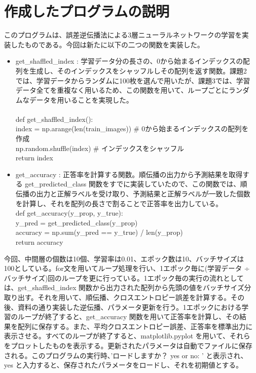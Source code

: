 \documentclass[11px,a4,dvipdfmx]{jsarticle}
\begin{document}
\section{作成したプログラムの説明}
このプログラムは、誤差逆伝播法による3層ニューラルネットワークの学習を実装したものである。今回は新たに以下の二つの関数を実装した。
\begin{itemize}
    \item get\_shaffled\_index : 学習データ分の長さの、0から始まるインデックスの配列を生成し、そのインデックスをシャッフルしその配列を返す関数。課題2では、学習データからランダムに100枚を選んで用いたが、課題3では、学習データ全てを重複なく用いるため、この関数を用いて、ループごとにランダムなデータを用いることを実現した。\\\\
    def get\_shaffled\_index():\\
    index = np.arange(len(train\_images)) \# 0から始まるインデックスの配列を作成\\
    np.random.shuffle(index) \# インデックスをシャッフル\\
    return index\\
    \item get\_accuracy : 正答率を計算する関数。順伝播の出力から予測結果を取得する get\_predicted\_class 関数をすでに実装していたので、この関数では、順伝播の出力と正解ラベルを受け取り、予測結果と正解ラベルが一致した個数を計算し、それを配列の長さで割ることで正答率を出力している。\\
    def get\_accuracy(y\_prop, y\_true):\\
    y\_pred = get\_predicted\_class(y\_prop) \\
    accuracy = np.sum(y\_pred == y\_true) / len(y\_prop)\\
    return accuracy
\end{itemize}
今回、中間層の個数は10個、学習率は0.01、エポック数は10、バッチサイズは100としている。for文を用いてループ処理を行い、1エポック毎に(学習データ ÷ バッチサイズ)回のループを更に行っている。1エポック毎の実行の流れとしては、get\_shaffled\_index 関数から出力された配列から先頭の値をバッチサイズ分取り出す。それを用いて、順伝播、クロスエントロピー誤差を計算する。その後、資料の通り実装した逆伝播、パラメータ更新を行う。1エポックにおける学習のループが終了すると、get\_accuracy 関数を用いて正答率を計算し、その結果を配列に保存する。また、平均クロスエントロピー誤差、正答率を標準出力に表示させる。すべてのループが終了すると、matplotlib.pyplot を用いて、それらをプロットしたものを表示する。更新されたパラメータは自動でファイルに保存される。このプログラムの実行時、'ロードしますか？ yes or no:  ' と表示され、yes と入力すると、保存されたパラメータをロードし、それを初期値とする。
\end{document}
